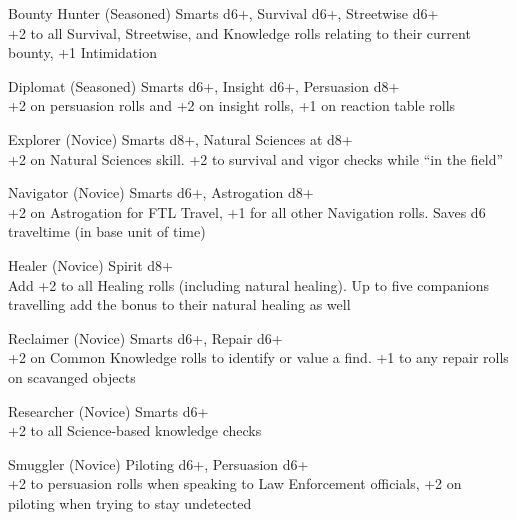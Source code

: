 \begin{multicols}{2}
\begin{genericsection}{Bounty Hunter (Seasoned)}
Smarts d6+, Survival d6+, Streetwise d6+\\
+2 to all Survival, Streetwise, and Knowledge rolls relating to their current bounty, +1 Intimidation
\end{genericsection}

\begin{genericsection}{Diplomat (Seasoned)}
Smarts d6+, Insight d6+, Persuasion d8+\\
+2 on persuasion rolls and +2 on insight rolls, +1 on reaction table rolls
\end{genericsection}

\begin{genericsection}{Explorer (Novice)}
Smarts d8+, Natural Sciences at d8+\\
+2 on Natural Sciences skill. +2 to survival and vigor checks while “in the field”
\end{genericsection}

\begin{genericsection}{Navigator (Novice)}
Smarts d6+, Astrogation d8+\\
+2 on Astrogation for FTL Travel, +1 for all other Navigation rolls. Saves d6 traveltime (in base unit of time)
\end{genericsection}

\begin{genericsection}{Healer (Novice)}
Spirit d8+\\
Add +2 to all Healing rolls (including natural healing). Up to five companions travelling add the bonus to their natural healing as well
\end{genericsection}

\begin{genericsection}{Reclaimer (Novice)}
Smarts d6+, Repair d6+\\
+2 on Common Knowledge rolls to identify or value a find. +1 to any repair rolls on scavanged objects
\end{genericsection}

\begin{genericsection}{Researcher (Novice)}
Smarts d6+\\
+2 to all Science-based knowledge checks
\end{genericsection}

\begin{genericsection}{Smuggler (Novice)}
Piloting d6+, Persuasion d6+\\
+2 to persuasion rolls when speaking to Law Enforcement officials, +2 on piloting when trying to stay undetected
\end{genericsection}


\end{multicols}
